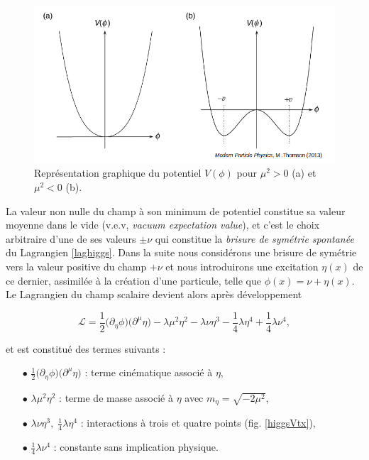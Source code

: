         \begin{figure}
        \centering
            \includegraphics[scale=0.4]{Chapitre2/Images/higgsV1D.png} 
            \caption{Représentation graphique du potentiel $V(\phi)$ pour $\mu^2>0$ (a) et $\mu^2<0$ (b).}
        \label{HiggsV1D}
        \end{figure}

        La valeur non nulle du champ à son minimum de potentiel constitue sa valeur moyenne dans le vide (v.e.v, \textit{vacuum expectation value}), et c'est le choix arbitraire d'une de ses valeurs $\pm\nu$ qui constitue la \textit{brisure de symétrie spontanée} du Lagrangien \ref{laghiggs}. Dans la suite nous considérons une brisure de symétrie vers la valeur positive du champ $+\nu$ et nous introduirons une excitation $\eta(x)$ de ce dernier, assimilée à la création d'une particule, telle que $\phi(x)=\nu+\eta(x)$. Le Lagrangien du champ scalaire devient alors après développement

        \begin{equation*}
        \boxed{
            \mathcal{L}=\frac{1}{2}\bigl(\partial_{\eta}\phi\bigr)\bigl(\partial^{\mu}\eta\bigr)-\lambda\mu^2\eta^2-\lambda\nu\eta^3-\frac{1}{4}\lambda\eta^4+\frac{1}{4}\lambda\nu^4,
        }
        \end{equation*}

        et est constitué des termes suivants :

        \begin{enumerate}
            \item[$\bullet$] $\frac{1}{2}\bigl(\partial_{\eta}\phi\bigr)\bigl(\partial^{\mu}\eta\bigr)$ : terme cinématique associé à $\eta$,
            \item[$\bullet$] $\lambda\mu^2\eta^2$ : terme de masse associé à $\eta$ avec $m_{\eta}=\sqrt{-2\mu^2}$,
            \item[$\bullet$] $\lambda\nu\eta^3,\;\frac{1}{4}\lambda\eta^4$ : interactions à trois et quatre points (fig. \ref{higgsVtx}),
            \item[$\bullet$] $\frac{1}{4}\lambda\nu^4$ : constante sans implication physique.
        \end{enumerate}

